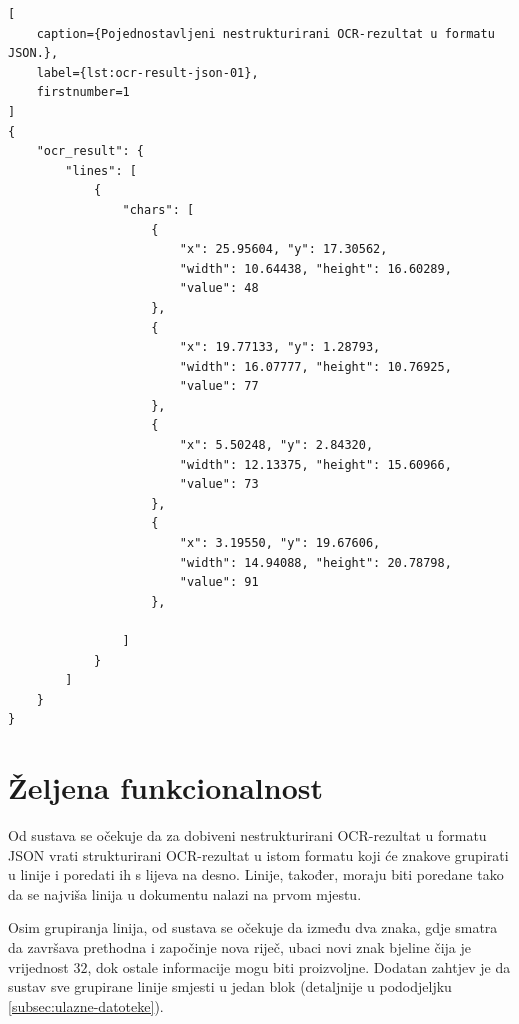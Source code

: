 \documentclass[times, utf8, zavrsni]{fer}
\begin{document}
\pagebreak

\begin{lstlisting}[
    caption={Pojednostavljeni nestrukturirani OCR-rezultat u formatu JSON.},
    label={lst:ocr-result-json-01},
    firstnumber=1
]
{
    "ocr_result": {
        "lines": [
            {
                "chars": [
                    {
                        "x": 25.95604, "y": 17.30562,
                        "width": 10.64438, "height": 16.60289,
                        "value": 48
                    },
                    {
                        "x": 19.77133, "y": 1.28793,
                        "width": 16.07777, "height": 10.76925,
                        "value": 77
                    },
                    {
                        "x": 5.50248, "y": 2.84320,
                        "width": 12.13375, "height": 15.60966,
                        "value": 73
                    },
                    {
                        "x": 3.19550, "y": 19.67606,
                        "width": 14.94088, "height": 20.78798,
                        "value": 91
                    },

                ]
            }
        ]
    }
}
\end{lstlisting}

\pagebreak








\section{Željena funkcionalnost}
\label{sec:željena-funkcionalnost}
Od sustava se očekuje da za dobiveni nestrukturirani OCR-rezultat u formatu
JSON vrati strukturirani OCR-rezultat u istom formatu koji će znakove
grupirati u linije i poredati ih s lijeva na desno.
Linije, također, moraju biti poredane tako da se najviša linija u dokumentu
nalazi na prvom mjestu.

Osim grupiranja linija, od sustava se očekuje da između dva znaka, gdje smatra
da završava prethodna i započinje nova riječ, ubaci novi znak bjeline čija je
vrijednost  $32$, dok ostale informacije mogu biti proizvoljne.
Dodatan zahtjev je da sustav sve grupirane linije smjesti u jedan blok
(detaljnije u pododjeljku \ref{subsec:ulazne-datoteke}).
\end{document}
